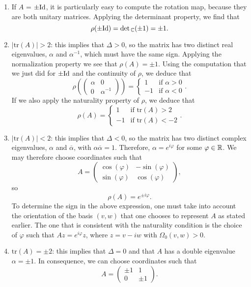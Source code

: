 \begin{enumerate}
	\item If $A$ = $\pm \mathrm{Id}$, it is particularly easy to compute the rotation map, because they are both unitary matrices. Applying the determinant property, we find that
	\[\rho(\pm \mathrm{Id}) = \det{}_{\mathbb{C}}(\pm 1) = \pm 1 .\]
	\item $|\text{tr}(A)| > 2$: this implies that $\Delta > 0$, so the matrix has two distinct real eigenvalues, $\alpha$ and $\alpha^{-1}$, which must have the same sign. Applying the normalization property we see that $\rho(A) = \pm 1$. Using the computation that we just did for $\pm \mathrm{Id}$ and the continuity of $\rho$, we deduce that
	\[\rho\left(\begin{pmatrix}\alpha & 0 \\ 0 & \alpha^{-1}\end{pmatrix}\right) = \left\{ \begin{array}{lc} 1 & \text{if } \alpha > 0 \\ -1 & \text{if } \alpha < 0 \end{array} \right. .\]
	If we also apply the naturality property of $\rho$, we deduce that
	\[\rho(A) = \left\{ \begin{array}{lc} 1 & \text{if tr}(A) > 2 \\ -1 & \text{if tr}(A) < -2 \end{array} \right. .\]
	\item $|\text{tr}(A)| < 2$: this implies that $\Delta < 0$, so the matrix has two distinct complex eigenvalues, $\alpha$ and $\overline{\alpha}$, with $\alpha\overline{\alpha} = 1$. Therefore, $\alpha = e^{i \varphi}$ for some $\varphi \in \mathbb{R}$. We may therefore choose coordinates such that
	\[A = \begin{pmatrix} \cos(\varphi) & -\sin(\varphi) \\ \sin(\varphi) & \cos(\varphi) \end{pmatrix} ,\]
	so
	\[\rho(A) = e^{\pm i \varphi} .\]
	To determine the sign in the above expression, one must take into account the orientation of the basis $(v,w)$ that one chooses to represent $A$ as stated earlier. The one that is consistent with the naturality condition is the choice of $\varphi$ such that $Az = e^{i \varphi} z$, where $z = v - iw$ with $\Omega_0(v,w) > 0$.
	\item $\text{tr}(A) = \pm 2$: this implies that $\Delta = 0$ and that $A$ has a double eigenvalue $\alpha = \pm 1$. In consequence, we can choose coordinates such that
	\[A = \begin{pmatrix} \pm 1 & 1 \\ 0 & \pm 1 \end{pmatrix} .\]

\end{enumerate}
